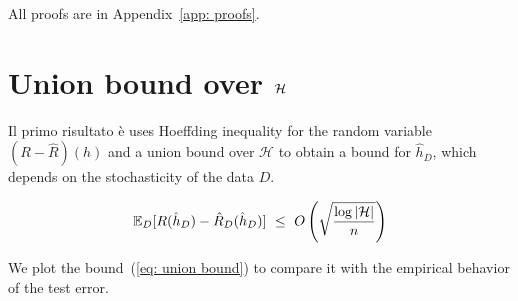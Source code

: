 \documentclass[reqno]{amsart}
\begin{document}
All proofs are in Appendix~\ref{app: proofs}. 
\bigskip 






\section{Union bound over $\mathcal{H}$}\label{sec: unionbound}
Il primo risultato è uses Hoeffding inequality for the random variable $(R - \hat R)(h)$ and a union bound over $\mathcal H$ to obtain a bound for $\hat h_D$, which depends on the stochasticity of the data $D$. 

\begin{theorem}\label{thm: unionbound}
\begin{equation}\label{eq: union bound}
    \mathbb{E}_D[R(\hat h_D) - \hat R_D (\hat h_D)] \,\, \le \,\, O\left(\sqrt{\frac{\log \vert \mathcal H \vert}{n}}\right)
\end{equation}
\end{theorem}

We plot the bound~(\ref{eq: union bound}) to compare it with the empirical behavior of the test error. 
\end{document}
